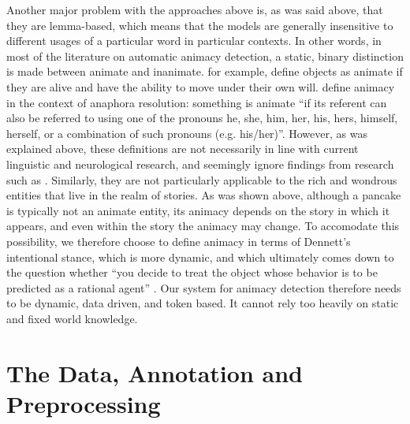 \documentclass[a4paper,UKenglish]{oasics}
\begin{document}
Another major problem with the approaches above is, as was said above,
that they are lemma-based, which means that the models are generally
insensitive to different usages of a particular word in particular
contexts. In other words, in most of the literature on automatic
animacy detection, a static, binary distinction is made between
animate and inanimate. \cite{bowman:12} for example, define objects as
animate if they are alive and have the ability to move under their own
will. \cite{orasan:07} define animacy in the context of anaphora
resolution: something is animate ``if its referent can also be
referred to using one of the pronouns he, she, him, her, his, hers,
himself, herself, or a combination of such pronouns
(e.g. his/her)''. However, as was explained above, these definitions
are not necessarily in line with current linguistic and neurological
research, and seemingly ignore findings from research such as
\cite{nieuwland:05}. Similarly, they are not particularly applicable
to the rich and wondrous entities that live in the realm of
stories. As was shown above, although a pancake is typically not an
animate entity, its animacy depends on the story in which it appears,
and even within the story the animacy may change. To accomodate this
possibility, we therefore choose to define animacy in terms of
Dennett's intentional stance, which is more dynamic, and which
ultimately comes down to the question whether ``you decide to treat
the object whose behavior is to be predicted as a rational agent''
\cite[pp. 17]{dennett:96}. Our system for animacy detection therefore
needs to be dynamic, data driven, and token based. It cannot rely too
heavily on static and fixed world knowledge.

\section{The Data, Annotation and Preprocessing}\label{sec:data}
\end{document}
